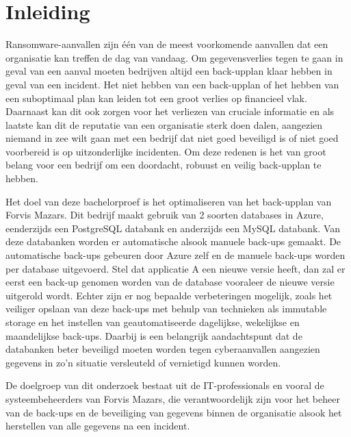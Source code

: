 
\section{Inleiding}%
\label{sec:inleiding}
Ransomware-aanvallen zijn één van de meest voorkomende aanvallen dat een organisatie kan treffen de dag van vandaag. Om gegevensverlies tegen te gaan in geval van een aanval moeten bedrijven altijd een back-upplan klaar hebben in geval van een incident. Het niet hebben van een back-upplan of het hebben van een suboptimaal plan kan leiden tot een groot verlies op financieel vlak. Daarnaast kan dit ook zorgen voor het verliezen van cruciale informatie en als laatste kan dit de reputatie van een organisatie sterk doen dalen, aangezien niemand in zee wilt gaan met een bedrijf dat niet goed beveiligd is of niet goed voorbereid is op uitzonderlijke incidenten. Om deze redenen is het van groot belang voor een bedrijf om een doordacht, robuust en veilig back-upplan te hebben.

Het doel van deze bachelorproef is het optimaliseren van het back-upplan van Forvis Mazars. Dit bedrijf maakt gebruik van 2 soorten databases in Azure, eenderzijds een PostgreSQL databank en anderzijds een MySQL databank. Van deze databanken worden er automatische alsook manuele back-ups gemaakt. De automatische back-ups gebeuren door Azure zelf en de manuele back-ups worden per database uitgevoerd. Stel dat applicatie A een nieuwe versie heeft, dan zal er eerst een back-up genomen worden van de database vooraleer de nieuwe versie uitgerold wordt. Echter zijn er nog bepaalde verbeteringen mogelijk, zoals het veiliger opslaan van deze back-ups met behulp van technieken als immutable storage en het instellen van geautomatiseerde dagelijkse, wekelijkse en maandelijkse back-ups. Daarbij is een belangrijk aandachtspunt dat de databanken beter beveiligd moeten worden tegen cyberaanvallen aangezien gegevens in zo'n situatie versleuteld of vernietigd kunnen worden.

De doelgroep van dit onderzoek bestaat uit de IT-professionals en vooral de systeembeheerders van Forvis Mazars, die verantwoordelijk zijn voor het beheer van de back-ups en de beveiliging van gegevens binnen de organisatie alsook het herstellen van alle gegevens na een incident.


